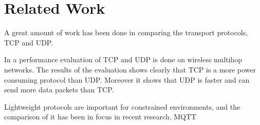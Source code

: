 \section{Related Work}
A great amount of work has been done in comparing the transport protocols, TCP and UDP. 

In \cite{giannoulis2009tcp} a performance evaluation of TCP and UDP is done on wireless multihop networks. The results of the evaluation shows clearly that TCP is a more power consuming protocol than UDP. Moreover it shows that UDP is faster and can send more data packets than TCP.


Lightweight protocols are important for constrained environments, and the comparison of it has been in focus in recent research.
MQTT \cite{bandyopadhyay2013lightweight}







